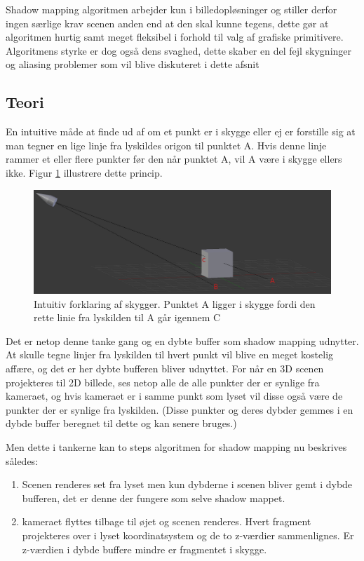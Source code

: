 \documentclass[11pt,a4paper]{article}
\begin{document}
Shadow mapping algoritmen arbejder kun i billedopløsninger og stiller derfor ingen særlige krav scenen anden end at den skal kunne tegens, dette gør at algoritmen hurtig samt meget fleksibel i forhold til valg af grafiske primitivere. Algoritmens styrke er dog også dens svaghed, dette skaber en del fejl skygninger og aliasing problemer som vil blive diskuteret i dette afsnit


\subsection{Teori}

En intuitive måde at finde ud af om et punkt er i skygge eller ej er forstille sig at man tegner en lige linje fra lyskildes origon til punktet A. Hvis denne linje rammer et eller flere punkter før den når punktet A, vil A være i  skygge ellers ikke. Figur \ref{shadowdesc} illustrere dette princip.

\begin{figure}[ht!]
\centering
\includegraphics[width=120mm]{img/1.png}
\caption{Intuitiv forklaring af skygger. Punktet A ligger i skygge fordi den rette linie fra lyskilden til A går igennem C}
\label{shadowdesc}
\end{figure}

Det er netop denne tanke gang og en dybte buffer som shadow mapping udnytter. At skulle tegne linjer fra lyskilden til hvert punkt vil blive en meget kostelig affære, og det er her dybte bufferen bliver udnyttet. For når en 3D scenen projekteres til 2D billede, ses netop alle de alle punkter der er synlige fra kameraet, og hvis kameraet er i samme punkt som lyset vil disse også være de punkter der er synlige fra lyskilden. (Disse punkter og deres dybder gemmes i en dybde buffer beregnet til dette og kan senere bruges.)

Men dette i tankerne kan to steps algoritmen for shadow mapping nu beskrives således:
\begin{enumerate}
\item Scenen renderes set fra lyset men kun dybderne i scenen bliver gemt i dybde bufferen, det er denne der fungere som selve shadow mappet.
\item kameraet flyttes tilbage til øjet og scenen renderes. Hvert fragment projekteres over i lyset koordinatsystem og de to z-værdier sammenlignes. Er z-værdien i dybde buffere mindre er fragmentet i skygge.
\end{enumerate}
\end{document}
